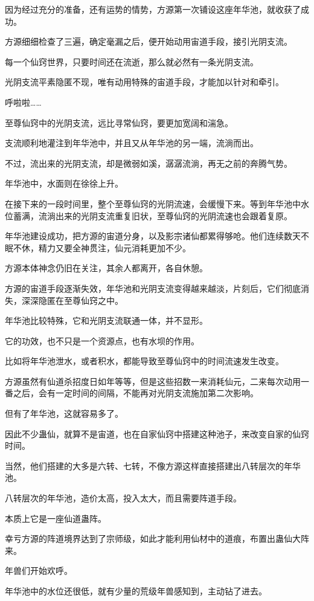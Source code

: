 \begin{this_body}
因为经过充分的准备，还有运势的情势，方源第一次铺设这座年华池，就收获了成功。

方源细细检查了三遍，确定毫漏之后，便开始动用宙道手段，接引光阴支流。

每一个仙窍世界，只要时间还在流逝，那么就必然有一条光阴支流。

光阴支流平素隐匿不现，唯有动用特殊的宙道手段，才能加以针对和牵引。

呼啦啦……

至尊仙窍中的光阴支流，远比寻常仙窍，要更加宽阔和湍急。

支流顺利地灌注到年华池中，并且又从年华池的另一端，流淌而出。

不过，流出来的光阴支流，却是微弱如溪，潺潺流淌，再无之前的奔腾气势。

年华池中，水面则在徐徐上升。

在接下来的一段时间里，整个至尊仙窍的光阴流速，会缓慢下来。等到年华池中水位蓄满，流淌出来的光阴支流重复旧状，至尊仙窍的光阴流速也会跟着复原。

年华池建设成功，把方源的宙道分身，以及影宗诸仙都累得够呛。他们连续数天不眠不休，精力又要全神贯注，仙元消耗更加不少。

方源本体神念仍旧在关注，其余人都离开，各自休憩。

方源的宙道手段逐渐失效，年华池和光阴支流变得越来越淡，片刻后，它们彻底消失，深深隐匿在至尊仙窍之中。

年华池比较特殊，它和光阴支流联通一体，并不显形。

它的功效，也不只是一个资源点，也有水坝的作用。

比如将年华池泄水，或者积水，都能导致至尊仙窍中的时间流速发生改变。

方源虽然有仙道杀招度日如年等等，但是这些招数一来消耗仙元，二来每次动用一番之后，会有一定时间的间隔，不能再对光阴支流施加第二次影响。

但有了年华池，这就容易多了。

因此不少蛊仙，就算不是宙道，也在自家仙窍中搭建这种池子，来改变自家的仙窍时间。

当然，他们搭建的大多是六转、七转，不像方源这样直接搭建出八转层次的年华池。

八转层次的年华池，造价太高，投入太大，而且需要阵道手段。

本质上它是一座仙道蛊阵。

幸亏方源的阵道境界达到了宗师级，如此才能利用仙材中的道痕，布置出蛊仙大阵来。

年兽们开始欢呼。

年华池中的水位还很低，就有少量的荒级年兽感知到，主动钻了进去。


\end{this_body}
